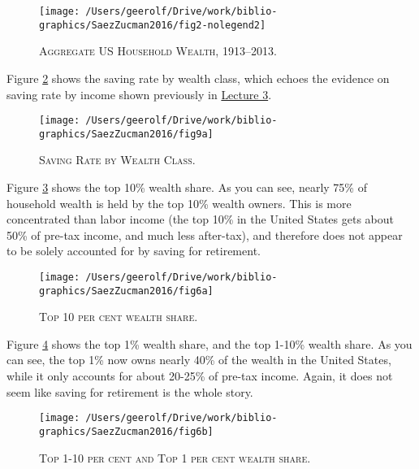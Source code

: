 \documentclass[]{book}
\theoremstyle{definition}
\theoremstyle{definition}
\theoremstyle{definition}
\theoremstyle{remark}
\begin{document}
\begin{figure}

{\centering \texttt{[image: /Users/geerolf/Drive/work/biblio-graphics/SaezZucman2016/fig2-nolegend2]} 

}

\caption{\textsc{Aggregate US Household Wealth,
1913--2013}.}\label{fig:saez-zucman-fig2}
\end{figure}

Figure \ref{fig:saez-zucman-fig9a} shows the saving rate by wealth
class, which echoes the evidence on saving rate by income shown
previously in \protect\hyperlink{two-period}{Lecture 3}.



\begin{figure}

{\centering \texttt{[image: /Users/geerolf/Drive/work/biblio-graphics/SaezZucman2016/fig9a]} 

}

\caption{\textsc{Saving Rate by Wealth Class}.}\label{fig:saez-zucman-fig9a}
\end{figure}

Figure \ref{fig:saez-zucman-fig6a} shows the top 10\% wealth share. As
you can see, nearly 75\% of household wealth is held by the top 10\%
wealth owners. This is more concentrated than labor income (the top 10\%
in the United States gets about 50\% of pre-tax income, and much less
after-tax), and therefore does not appear to be solely accounted for by
saving for retirement.



\begin{figure}

{\centering \texttt{[image: /Users/geerolf/Drive/work/biblio-graphics/SaezZucman2016/fig6a]} 

}

\caption{\textsc{Top 10 per cent wealth share}.}\label{fig:saez-zucman-fig6a}
\end{figure}

Figure \ref{fig:saez-zucman-fig6b} shows the top 1\% wealth share, and
the top 1-10\% wealth share. As you can see, the top 1\% now owns nearly
40\% of the wealth in the United States, while it only accounts for
about 20-25\% of pre-tax income. Again, it does not seem like saving for
retirement is the whole story.




\begin{figure}

{\centering \texttt{[image: /Users/geerolf/Drive/work/biblio-graphics/SaezZucman2016/fig6b]} 

}

\caption{\textsc{Top 1-10 per cent and Top 1 per cent
wealth share}.}\label{fig:saez-zucman-fig6b}
\end{figure}
\end{document}
